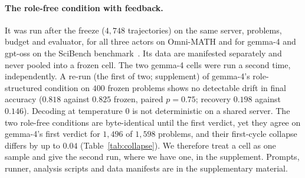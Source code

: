 \paragraph{The role-free condition with feedback.} It was run after the freeze
($4{,}748$ trajectories) on the same server, problems, budget and evaluator,
for all three actors on Omni-MATH and for gemma-4 and gpt-oss on the
SciBench benchmark~\cite{wang2024scibench}. Its data are manifested
separately and never pooled into a frozen cell. The two gemma-4 cells were
run a second time, independently. A re-run (the first of two; supplement) of gemma-4's role-structured
condition on $400$ frozen problems shows no detectable drift in final
accuracy ($0.818$ against $0.825$ frozen, paired $p=0.75$; recovery $0.198$
against $0.146$). Decoding at temperature $0$ is not deterministic on a
shared server. The two role-free conditions are byte-identical until the
first verdict, yet they agree on gemma-4's first verdict for $1{,}496$ of
$1{,}598$ problems, and their first-cycle collapse differs by up to $0.04$
(Table~\ref{tab:collapse}). We therefore treat a cell as one sample and give
the second run, where we have one, in the supplement. Prompts, runner,
analysis scripts and data manifests are in the supplementary material.
